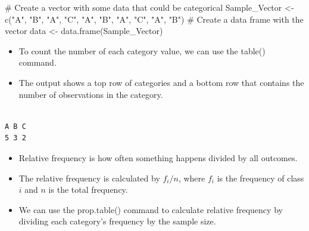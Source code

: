 \documentclass[
  letterpaper,
  DIV=11,
  numbers=noendperiod]{scrreprt}
\newenvironment{Shaded}{\begin{snugshade}}{\end{snugshade}}
\newcommand{\CommentTok}[1]{\textcolor[rgb]{0.37,0.37,0.37}{#1}}
\newcommand{\FunctionTok}[1]{\textcolor[rgb]{0.28,0.35,0.67}{#1}}
\newcommand{\NormalTok}[1]{\textcolor[rgb]{0.00,0.23,0.31}{#1}}
\newcommand{\OtherTok}[1]{\textcolor[rgb]{0.00,0.23,0.31}{#1}}
\newcommand{\SpecialCharTok}[1]{\textcolor[rgb]{0.37,0.37,0.37}{#1}}
\newcommand{\StringTok}[1]{\textcolor[rgb]{0.13,0.47,0.30}{#1}}
\providecommand{\tightlist}{%
  \setlength{\itemsep}{0pt}\setlength{\parskip}{0pt}}\usepackage{longtable,booktabs,array}
\begin{document}
\begin{Shaded}
\begin{Highlighting}[]
\CommentTok{\# Create a vector with some data that could be categorical}
\NormalTok{Sample\_Vector }\OtherTok{\textless{}{-}} \FunctionTok{c}\NormalTok{(}\StringTok{"A"}\NormalTok{, }\StringTok{"B"}\NormalTok{, }\StringTok{"A"}\NormalTok{, }\StringTok{"C"}\NormalTok{, }\StringTok{"A"}\NormalTok{, }\StringTok{"B"}\NormalTok{, }\StringTok{"A"}\NormalTok{, }\StringTok{"C"}\NormalTok{, }\StringTok{"A"}\NormalTok{, }\StringTok{"B"}\NormalTok{)}
\CommentTok{\# Create a data frame with the vector}
\NormalTok{data }\OtherTok{\textless{}{-}} \FunctionTok{data.frame}\NormalTok{(Sample\_Vector)}
\end{Highlighting}
\end{Shaded}

\begin{itemize}
\tightlist
\item
  To count the number of each category value, we can use the table()
  command.
\item
  The output shows a top row of categories and a bottom row that
  contains the number of observations in the category.
\end{itemize}

\begin{Shaded}
\end{Shaded}

\begin{verbatim}

A B C 
5 3 2 
\end{verbatim}

\begin{itemize}
\tightlist
\item
  Relative frequency is how often something happens divided by all
  outcomes.
\item
  The relative frequency is calculated by \(f_i/n\), where \(f_i\) is
  the frequency of class \(i\) and \(n\) is the total frequency.
\item
  We can use the prop.table() command to calculate relative frequency by
  dividing each category's frequency by the sample size.
\end{itemize}
\end{document}
